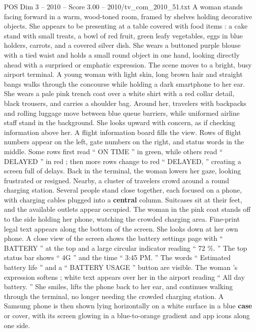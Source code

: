 \begin{textsample}{POS Dim 3 – 2010 – Score 3.00 – 2010/tv\_com\_2010\_51.txt}  \label{ex:f3_pos_086}
A woman stands facing forward in a warm, wood-toned room, framed by shelves holding decorative objects.
She appears to be presenting at a table covered with food items : a cake stand with small treats, a bowl of red fruit, green leafy vegetables, eggs in blue holders, carrots, and a covered silver dish.
She wears a buttoned purple blouse with a tied waist and holds a small round object in one hand, looking directly ahead with a surprised or emphatic expression.
The scene moves to a bright, busy airport terminal.
A young woman with light skin, long brown hair and straight bangs walks through the concourse while holding a dark smartphone to her ear.
She wears a pale pink trench coat over a white shirt with a red collar detail, black trousers, and carries a shoulder bag.
Around her, travelers with backpacks and rolling luggage move between blue queue barriers, while uniformed airline staff stand in the background.
She looks upward with concern, as if checking information above her.
A flight information board fills the view.
Rows of flight numbers appear on the left, gate numbers on the right, and status words in the middle.
Some rows first read “ ON TIME ” in green, while others read “ DELAYED ” in red ; then more rows change to red “ DELAYED, ” creating a screen full of delays.
Back in the terminal, the woman lowers her gaze, looking frustrated or resigned.
Nearby, a cluster of travelers crowd around a round charging station.
Several people stand close together, each focused on a phone, with charging cables plugged into a \textbf{central} column.
Suitcases sit at their feet, and the available outlets appear occupied.
The woman in the pink coat stands off to the side holding her phone, watching the crowded charging area.
Fine-print legal text appears along the bottom of the screen.
She looks down at her own phone.
A close view of the screen shows the battery settings page with “ BATTERY ” at the top and a large circular indicator reading “ 72 \%. ” The top status bar shows “ 4G ” and the time “ 3:45 PM. ” The words “ Estimated battery life ” and a “ BATTERY USAGE ” button are visible.
The woman ’s expression softens ; white text appears over her in the airport reading “ All day battery. ” She smiles, lifts the phone back to her ear, and continues walking through the terminal, no longer needing the crowded charging station.
A Samsung phone is then shown lying horizontally on a white surface in a blue \textbf{case} or cover, with its screen glowing in a blue-to-orange gradient and app icons along one side.

\end{textsample}
